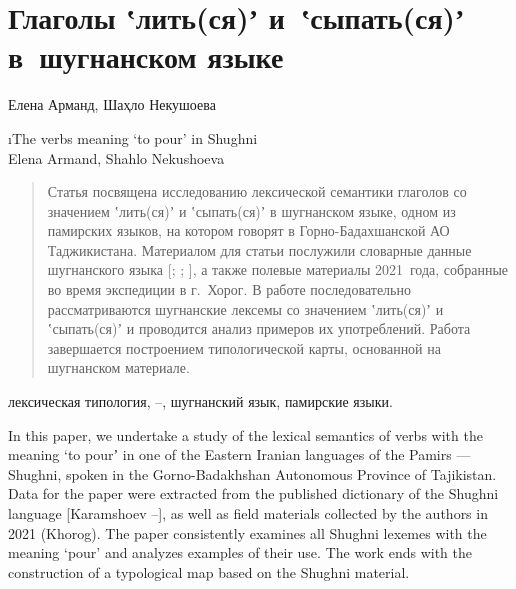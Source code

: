 \chapter*{Глаголы ʽлить(ся)ʼ и~ʽсыпать(ся)ʼ в~шугнанском языке}
\setcounter{section}{0}
\label{chapter-armand-pour}

\begin{customauthorname}
Елена Арманд, Шаҳло Некушоева
\end{customauthorname}

\begin{englishtitle}
\i{The verbs meaning ‘to pour’ in Shughni\\{\small Elena Armand, Shahlo Nekushoeva}}
\end{englishtitle}

\begin{abstract}
Статья посвящена исследованию лексической семантики глаголов со значением ʽлить(ся)ʼ и ʽсыпать(ся)ʼ в шугнанском языке, одном из памирских языков, на котором говорят в Горно-Бадахшанской АО Таджикистана. Материалом для статьи послужили словарные данные шугнанского языка [\cite{karamshoev1988}; \cite*{karamshoev1991}; \cite*{karamshoev1999}], а также полевые материалы 2021~года, собранные во время экспедиции в г.~Хорог. В работе последовательно рассматриваются шугнанские лексемы со значением ʽлить(ся)ʼ и ʽсыпать(ся)ʼ и проводится анализ примеров их употреблений. Работа завершается построением типологической карты, основанной на шугнанском материале.
\end{abstract}

\begin{keywords}
лексическая типология, –, шугнанский язык, памирские языки.
\end{keywords}

\begin{eng-abstract}
In this paper, we undertake a study of the lexical semantics of verbs with the meaning ‘to pourʼ in one of the Eastern Iranian languages of the Pamirs — Shughni, spoken in the Gorno-Badakhshan Autonomous Province of Tajikistan. Data for the paper were extracted from the published dictionary of the Shughni language [Karamshoev \cite*{karamshoev1988}–\cite*{karamshoev1999}], as well as field materials collected by the authors in 2021 (Khorog). The paper consistently examines all Shughni lexemes with the meaning ‘pour’ and analyzes examples of their use. The work ends with the construction of a typological map based on the Shughni material.
\end{eng-abstract}

